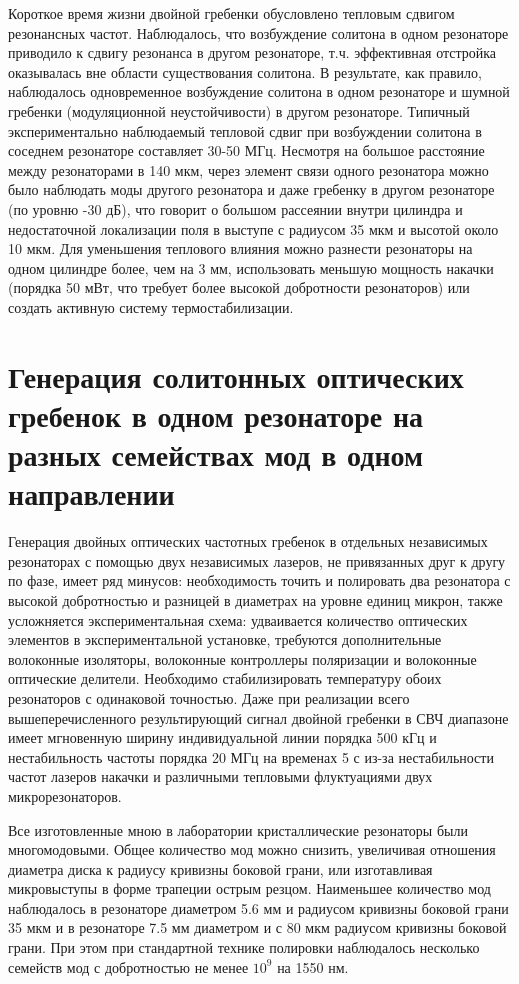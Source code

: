 Короткое время жизни двойной гребенки обусловлено тепловым сдвигом резонансных частот. Наблюдалось, что возбуждение солитона в одном резонаторе приводило к сдвигу резонанса в другом резонаторе, т.ч. эффективная отстройка оказывалась вне области существования солитона. В результате, как правило, наблюдалось одновременное возбуждение солитона в одном резонаторе и шумной гребенки (модуляционной неустойчивости) в другом резонаторе. Типичный экспериментально наблюдаемый тепловой сдвиг при возбуждении солитона в соседнем резонаторе составляет 30-50 МГц. Несмотря на большое расстояние между резонаторами в 140 мкм, через элемент связи одного резонатора можно было наблюдать моды другого резонатора и даже гребенку в другом резонаторе (по уровню -30 дБ), что говорит о большом рассеянии внутри цилиндра и недостаточной локализации поля в выступе с радиусом 35 мкм и высотой около 10 мкм. Для уменьшения теплового влияния можно разнести резонаторы на одном цилиндре более, чем на 3 мм, использовать меньшую мощность накачки (порядка 50 мВт, что требует более высокой добротности резонаторов) или создать активную систему термостабилизации.

\section{Генерация солитонных оптических гребенок в одном резонаторе на разных семействах мод в одном направлении}

Генерация двойных оптических частотных гребенок в отдельных независимых резонаторах с помощью двух независимых лазеров, не привязанных друг к другу по фазе, имеет ряд минусов: необходимость точить и полировать два резонатора с высокой добротностью и разницей в диаметрах на уровне единиц микрон, также усложняется экспериментальная схема: удваивается количество оптических элементов в экспериментальной установке, требуются дополнительные волоконные изоляторы, волоконные контроллеры поляризации и волоконные оптические делители. Необходимо стабилизировать температуру обоих резонаторов с одинаковой точностью. Даже при реализации всего вышеперечисленного результирующий сигнал двойной гребенки в СВЧ диапазоне имеет мгновенную ширину индивидуальной линии порядка 500 кГц и нестабильность частоты порядка 20 МГц на временах 5 с из-за нестабильности частот лазеров накачки и различными тепловыми флуктуациями двух микрорезонаторов.

Все изготовленные мною в лаборатории кристаллические резонаторы были многомодовыми. Общее количество мод можно снизить, увеличивая отношения диаметра диска к радиусу кривизны боковой грани, или изготавливая микровыступы в форме трапеции острым резцом. Наименьшее количество мод наблюдалось в резонаторе диаметром 5.6 мм и радиусом кривизны боковой грани 35 мкм и в резонаторе 7.5 мм диаметром и с 80 мкм радиусом кривизны боковой грани. При этом при стандартной технике полировки наблюдалось несколько семейств мод с добротностью не менее $10^9$ на 1550 нм.

